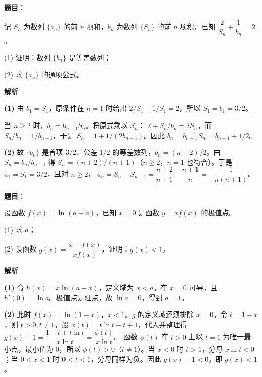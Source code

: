 \begin{answer}

\textbf{题目}：

记 $S_n$ 为数列 $\{a_n\}$ 的前 $n$ 项和，$b_n$ 为数列 $\{S_n\}$ 的前 $n$ 项积，已知 $\dfrac2{S_n}+\dfrac1{b_n}=2$。

  (1) 证明：数列 $\{b_n\}$ 是等差数列；

  (2) 求 $\{a_n\}$ 的通项公式。

\textbf{解析}

\textbf{(1)} 由 $b_1=S_1$，原条件在 $n=1$ 时给出 $2/S_1+1/S_1=2$，所以 $S_1=b_1=3/2$。

当 $n\geqslant2$ 时，$b_n=b_{n-1}S_n$。将原式乘以 $S_n$：
$2+S_n/b_n=2S_n$，而 $S_n/b_n=1/b_{n-1}$，于是
$S_n=1+1/(2b_{n-1})$。因此
$b_n=b_{n-1}S_n=b_{n-1}+1/2$。

\textbf{(2)} 故 $\{b_n\}$ 是首项 $3/2$、公差 $1/2$ 的等差数列，$b_n=(n+2)/2$。由 $S_n=b_n/b_{n-1}$ 得 $S_n=(n+2)/(n+1)$（$n\geqslant2$，$n=1$ 也符合）。于是
$a_1=S_1=3/2$，且对 $n\geqslant2$，
$a_n=S_n-S_{n-1}=\dfrac{n+2}{n+1}-\dfrac{n+1}{n}=-\dfrac1{n(n+1)}$。



\end{answer}
\begin{answer}

\textbf{题目}：

设函数 $f(x)=\ln(a-x)$，已知 $x=0$ 是函数 $y=xf(x)$ 的极值点。

  (1) 求 $a$；

  (2) 设函数 $g(x)=\dfrac{x+f(x)}{xf(x)}$，证明：$g(x)<1$。

\textbf{解析}

\textbf{(1)} 令 $h(x)=x\ln(a-x)$，定义域为 $x<a$。在 $x=0$ 可导，且
$h'(0)=\ln a$。极值点是驻点，故 $\ln a=0$，得到 $a=1$。

\textbf{(2)} 此时 $f(x)=\ln(1-x)$，$x<1$。$g$ 的定义域还须排除 $x=0$。令 $t=1-x$，则 $t>0,t\ne1$。设 $\phi(t)=t\ln t-t+1$，代入并整理得
$g(x)-1=\dfrac{1-t+t\ln t}{x\ln t}=\dfrac{\phi(t)}{x\ln t}$。
函数 $\phi(t)$ 在 $t>0$ 上以 $t=1$ 为唯一最小点，最小值为 $0$，所以 $\phi(t)>0$（$t\ne1$）。当 $x<0$ 时 $t>1$，分母 $x\ln t<0$；当 $0<x<1$ 时 $0<t<1$，分母同样为负。因此 $g(x)-1<0$，即 $g(x)<1$。



\end{answer}
